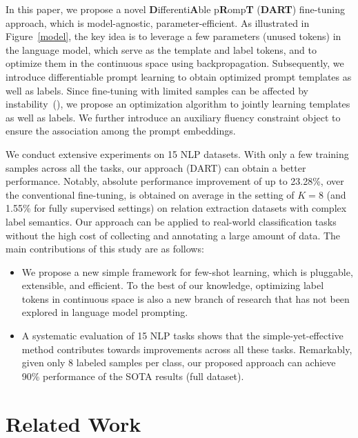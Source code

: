 \documentclass{article} \usepackage{iclr2022_conference,times}
\begin{document}
In this paper, we propose a novel \textbf{D}ifferenti\textbf{A}ble p\textbf{R}omp\textbf{T} (\textbf{DART}) fine-tuning approach, which is model-agnostic, parameter-efficient.
As illustrated in Figure~\ref{model}, the key idea is to leverage a few parameters (unused tokens) in the language model, which serve as the template and label tokens, and to optimize them in the continuous space using backpropagation. 
Subsequently, we introduce differentiable prompt learning to obtain optimized prompt templates as well as labels. 
Since fine-tuning with limited samples can be affected by instability~(\cite{DBLP:journals/corr/abs-2002-06305,zhang2021revisiting}), we propose an optimization algorithm to jointly learning templates as well as labels. 
We further introduce an auxiliary fluency constraint object to ensure the association among the prompt embeddings.

We conduct extensive experiments on 15 NLP datasets.
With only a few training samples across all the tasks, our approach (DART) can obtain a better performance. 
Notably, absolute performance improvement of up to 23.28\%, over the conventional fine-tuning, is obtained on average in the setting of $K=8$ (and 1.55\% for fully supervised settings) on relation extraction datasets with complex label semantics.
Our approach can be applied to real-world classification tasks without the high cost of collecting and annotating a large amount of data. 
The main contributions of this study are as follows:

\begin{itemize}
    \item We propose a new simple framework for few-shot learning, which is pluggable, extensible, and efficient. 
    To the best of our knowledge, optimizing label tokens in continuous space is also a new branch of research that has not been explored in language model prompting.
    
    \item A systematic evaluation of 15 NLP tasks shows that the simple-yet-effective method contributes towards improvements across all these tasks.  
    Remarkably, given only 8 labeled samples per class, our proposed approach can achieve 90\% performance of the SOTA results (full dataset).
\end{itemize}

\section{Related Work}
\end{document}

